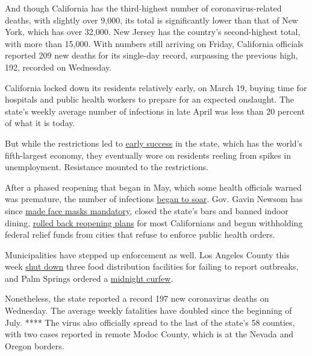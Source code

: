 And though California has the third-highest number of
coronavirus-related deaths, with slightly over 9,000, its total is
significantly lower than that of New York, which has over 32,000. New
Jersey has the country's second-highest total, with more than 15,000.
With numbers still arriving on Friday, California officials reported 209
new deaths for its single-day record, surpassing the previous high, 192,
recorded on Wednesday.

California locked down its residents relatively early, on March 19,
buying time for hospitals and public health workers to prepare for an
expected onslaught. The state's weekly average number of infections in
late April was less than 20 percent of what it is today.

But while the restrictions led to
\href{https://www.nytimes3xbfgragh.onion/2020/04/14/us/california-coronavirus-shutdown.html}{early
success} in the state, which has the world's fifth-largest economy, they
eventually wore on residents reeling from spikes in unemployment.
Resistance mounted to the restrictions.

After a phased reopening that began in May, which some health officials
warned was premature, the number of infections
\href{https://www.nytimes3xbfgragh.onion/2020/06/29/us/california-coronavirus-reopening.html}{began
to soar}. Gov. Gavin Newsom has since
\href{https://www.nytimes3xbfgragh.onion/interactive/2020/07/17/upshot/coronavirus-face-mask-map.html}{made
face masks mandatory}, closed the state's bars and banned indoor dining,
\href{https://www.nytimes3xbfgragh.onion/2020/07/14/us/california-counties-reopening.html}{rolled
back reopening plans} for most Californians and begun withholding
federal relief funds from cities that refuse to enforce public health
orders.

Municipalities have stepped up enforcement as well. Los Angeles County
this week
\href{https://www.latimes.com/california/story/2020-07-29/county-shuts-three-businesses-for-failing-to-report-coronavirus-outbreaks}{shut
down} three food distribution facilities for failing to report
outbreaks, and Palm Springs ordered a
\href{https://www.palmspringsca.gov/home/showdocument?id=75670}{midnight
curfew}.

Nonetheless, the state reported a record 197 new coronavirus deaths on
Wednesday. The average weekly fatalities have doubled since the
beginning of July. **** The virus also officially spread to the last of
the state's 58 counties, with two cases reported in remote Modoc County,
which is at the Nevada and Oregon borders.

